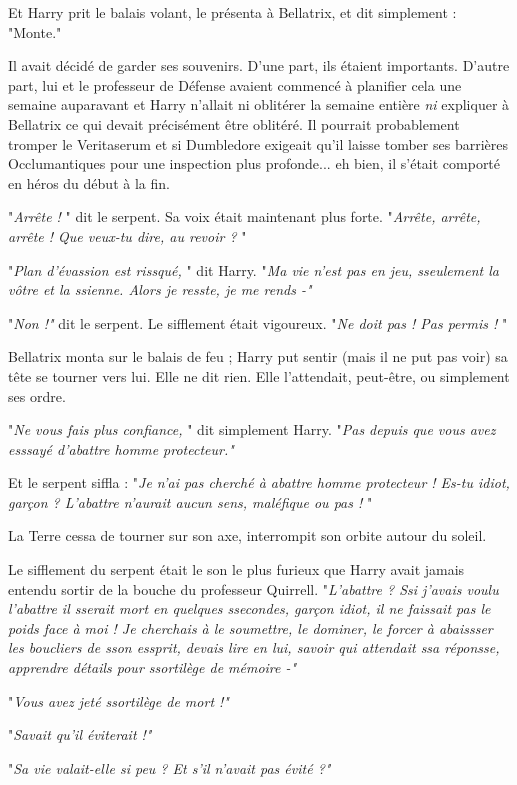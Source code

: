 Et Harry prit le balais volant, le présenta à Bellatrix, et dit simplement : "Monte."

Il avait décidé de garder ses souvenirs. D'une part, ils étaient importants. D'autre part, lui et le professeur de Défense avaient commencé à planifier cela une semaine auparavant et Harry n'allait ni oblitérer la semaine entière \emph{ni } expliquer à Bellatrix ce qui devait précisément être oblitéré. Il pourrait probablement tromper le Veritaserum et si Dumbledore exigeait qu'il laisse tomber ses barrières Occlumantiques pour une inspection plus profonde... eh bien, il s'était comporté en héros du début à la fin.

"\emph{Arrête !} " dit le serpent. Sa voix était maintenant plus forte. "\emph{Arrête, arrête, arrête ! Que veux-tu dire, au revoir ?} "

"\emph{Plan d'évassion est rissqué,} " dit Harry. "\emph{Ma vie n'est pas en jeu, sseulement la vôtre et la ssienne. Alors je resste, je me rends -"} 

"\emph{Non !"}  dit le serpent. Le sifflement était vigoureux. "\emph{Ne doit pas ! Pas permis !} "

Bellatrix monta sur le balais de feu ; Harry put sentir (mais il ne put pas voir) sa tête se tourner vers lui. Elle ne dit rien. Elle l'attendait, peut-être, ou simplement ses ordre.

"\emph{Ne vous fais plus confiance,} " dit simplement Harry. "\emph{Pas depuis que vous avez esssayé d'abattre homme protecteur."} 

Et le serpent siffla : "\emph{Je n'ai pas cherché à abattre homme protecteur ! Es-tu idiot, garçon ? L'abattre n'aurait aucun sens, maléfique ou pas !} "

La Terre cessa de tourner sur son axe, interrompit son orbite autour du soleil.

Le sifflement du serpent était le son le plus furieux que Harry avait jamais entendu sortir de la bouche du professeur Quirrell. "\emph{L'abattre ? Ssi j'avais voulu l'abattre il sserait mort en quelques ssecondes, garçon idiot, il ne faissait pas le poids face à moi ! Je cherchais à le soumettre, le dominer, le forcer à abaissser les boucliers de sson essprit, devais lire en lui, savoir qui attendait ssa réponsse, apprendre détails pour ssortilège de mémoire -"} 

"\emph{Vous avez jeté ssortilège de mort !"} 

"\emph{Savait qu'il éviterait !"} 

"\emph{Sa vie valait-elle si peu ? Et s'il n'avait pas évité ?"} 

